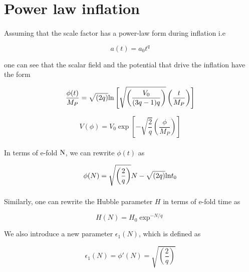 \documentclass[12pt,a4paper,oneside]{book}
\begin{document}
\section{Power law inflation}

\paragraph*{} Assuming that the scale factor has a power-law form during inflation i.e

\begin{equation}\label{eq:power}
a(t) = a_0t^q
\end{equation}

\noindent one can see that the scalar field and the potential that drive the inflation have the form

\begin{equation}
\frac{\phi(t)}{M_P} =\sqrt{\left(2q\right)} {\rm ln}\left[\sqrt{\left(\frac{V_0}{(3q-1)q}\right)}\left(\frac{t}{M_P}\right)\right]
\end{equation}

\begin{equation}
V(\phi) = V_0\exp\left[-\sqrt{\frac{2}{q}}\left(\frac{\phi}{M_P}\right)\right]
\end{equation}

\paragraph*{} In terms of e-fold ${\rm N}$, we can rewrite $\phi(t)$ as

\begin{equation}
\phi(N) = \sqrt{\left(\frac{2}{q}\right)} N - \sqrt{\left(2q\right)}{\rm ln}t_0
\end{equation}

\paragraph*{} Similarly, one can rewrite the Hubble parameter $H$ in terms of e-fold time as 

\begin{equation}
H(N) = H_0\exp^{-N/q}
\end{equation}

\noindent We also introduce a new parameter $\epsilon_1(N)$, which is defined as

\begin{equation}
\epsilon_1(N) = \phi'(N) = \sqrt{\left(\frac{2}{q}\right)}
\end{equation}
\end{document}
